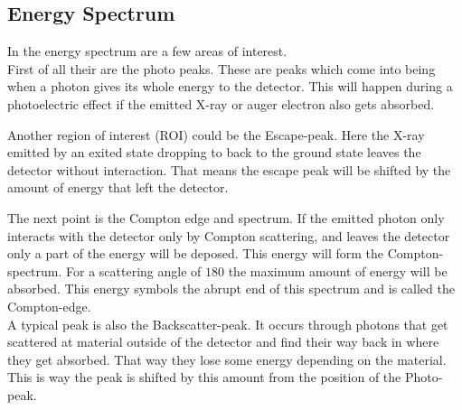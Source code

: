 \documentclass[30pt,a4paper]{article}
\begin{document}
 	\subsection{Energy Spectrum}
 	In the energy spectrum are a few areas of interest. \\
 	First of all their are the photo peaks. These are peaks which come into being when a photon gives its whole energy to the detector. This will happen during a photoelectric effect if the emitted X-ray or auger electron also gets absorbed.\par
 	Another region of interest (ROI) could be the Escape-peak. Here the X-ray emitted by an exited state dropping to back to the ground state leaves the detector without interaction. That means the escape peak will be shifted by the amount of energy that left the detector.\par
 	The next point is the Compton edge and spectrum. If the emitted photon only interacts with the detector only by Compton scattering, and leaves the detector only a part of the energy will be deposed. This energy will form the Compton-spectrum. For a scattering angle of $180$ the maximum amount of energy will be absorbed. This energy symbols the abrupt end of this spectrum and is called the Compton-edge.\\
 	A typical peak is also the Backscatter-peak. It occurs through photons that get scattered at material outside of the detector and find their way back in where they get absorbed. That way they lose some energy depending on the material. This is way the peak is shifted by this amount from the position of the Photo-peak. 
\end{document}
